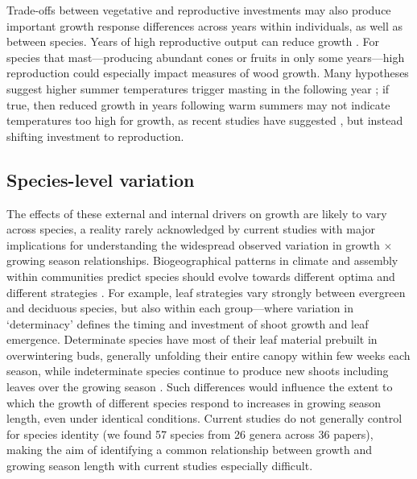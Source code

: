 \documentclass[11pt]{article}
\begin{document}
Trade-offs between vegetative and reproductive investments may also produce important growth response differences across years within individuals, as well as between species. Years of high reproductive output can reduce growth \citep{thomas2011bookchptr,hacket2016tree}. For species that mast---producing abundant cones or fruits in only some years---high reproduction could especially impact measures of wood growth. Many hypotheses suggest higher summer temperatures trigger masting in the following year \citep{hacket2016tree,hacket2016consistent}; if true, then reduced growth in years following warm summers may not indicate temperatures too high for growth, as recent studies have suggested \citep[e.g.,][]{gantois2022new,dow2022warm}, but instead shifting investment to reproduction.

\subsection*{Species-level variation}
The effects of these external and internal drivers on growth are likely to vary across species, a reality rarely acknowledged by current studies \citep[Fig. \ref{fig:hypotheses}c, but strongly predicts variation when studied, see][]{cuny2012life,michelot2012comparing} with major implications for understanding the widespread observed variation in growth $\times$ growing season relationships. Biogeographical patterns in climate and assembly within communities predict species should evolve towards different optima and different strategies \citep{Ackerly:2009ly,buckley2012functional}. For example, leaf strategies vary strongly between evergreen and deciduous species, but also within each group---where variation in `determinacy' defines the timing and investment of shoot growth and leaf emergence. Determinate species have most of their leaf material prebuilt in overwintering buds, generally unfolding their entire canopy within few weeks each season, while indeterminate species continue to produce new shoots including leaves over the growing season \citep{kikuzawa1982leaf,Lechowicz:1984cr}. Such differences would influence the extent to which the growth of different species respond to increases in growing season length, even under identical conditions. Current studies do not generally control for species identity (we found  57 species from 26 genera across 36 papers), making the aim of identifying a common relationship between growth and growing season length with current studies especially difficult.
\end{document}
